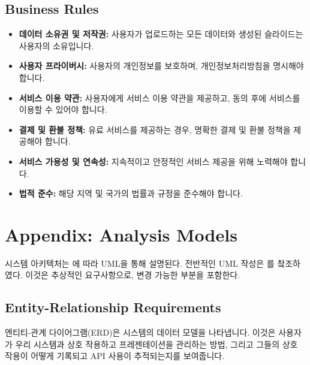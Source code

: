 \documentclass[a4paper, 12pt]{article}
\begin{document}
\subsection{Business Rules}
\begin{itemize}
    \item \textbf{데이터 소유권 및 저작권:} 사용자가 업로드하는 모든 데이터와 생성된 슬라이드는 사용자의 소유입니다.

    \item \textbf{사용자 프라이버시:} 사용자의 개인정보를 보호하며, 개인정보처리방침을 명시해야 합니다.

    \item \textbf{서비스 이용 약관:} 사용자에게 서비스 이용 약관을 제공하고, 동의 후에 서비스를 이용할 수 있어야 합니다.

    \item \textbf{결제 및 환불 정책:} 유료 서비스를 제공하는 경우, 명확한 결제 및 환불 정책을 제공해야 합니다.

    \item \textbf{서비스 가용성 및 연속성:} 지속적이고 안정적인 서비스 제공을 위해 노력해야 합니다.

    \item \textbf{법적 준수:} 해당 지역 및 국가의 법률과 규정을 준수해야 합니다.
\end{itemize}


\appendix
\section{Appendix: Analysis Models}

시스템 아키텍처는 \cite{sommerville2015software}에 따라 UML을 통해 설명된다. 전반적인 UML 작성은 \cite{sveidqvist2021official}를 챀조하였다. 이것은 추상적인 요구사항으로, 변경 가능한 부분을 포함한다. 

\subsection{Entity-Relationship Requirements}

엔티티-관계 다이어그램(ERD)은 시스템의 데이터 모델을 나타냅니다. 이것은 사용자가 우리 시스템과 상호 작용하고 프레젠테이션을 관리하는 방법, 그리고 그들의 상호 작용이 어떻게 기록되고 API 사용이 추적되는지를 보여줍니다.
\end{document}
